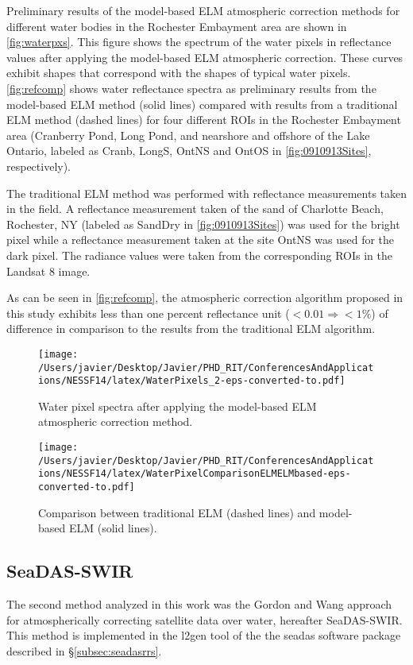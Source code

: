 Preliminary results of the model-based ELM atmospheric correction methods for different water bodies in the Rochester Embayment area are shown in \autoref{fig:waterpxs}. This figure shows the spectrum of the water pixels in reflectance values after applying the model-based ELM atmospheric correction. These curves exhibit shapes that correspond with the shapes of typical water pixels. \autoref{fig:refcomp} shows water reflectance spectra as preliminary results from the model-based ELM method (solid lines) compared with results from a traditional ELM method (dashed lines) for four different ROIs in the Rochester Embayment area (Cranberry Pond, Long Pond, and nearshore and offshore of the Lake Ontario, labeled as Cranb, LongS, OntNS and OntOS in \autoref{fig:0910913Sites}, respectively). 


The traditional ELM method was performed with reflectance measurements taken in the field. A reflectance measurement taken of the sand of Charlotte Beach, Rochester, NY (labeled as SandDry in \autoref{fig:0910913Sites}) was used for the bright pixel while a reflectance measurement taken at the site OntNS was used for the dark pixel. The radiance values were taken from the corresponding ROIs in the Landsat 8 image. 

As can be seen in \autoref{fig:refcomp}, the atmospheric correction algorithm proposed in this study exhibits less than one percent reflectance unit ($<0.01\Rightarrow <1\%$) of difference in comparison to the results from the traditional ELM algorithm.

\begin{figure}[htb]
    \centering
      \texttt{[image: /Users/javier/Desktop/Javier/PHD\_RIT/ConferencesAndApplications/NESSF14/latex/WaterPixels\_2-eps-converted-to.pdf]}
      \caption{Water pixel spectra after applying the model-based ELM atmospheric correction method.}
      \label{fig:waterpxs}
\end{figure}


\begin{figure}[htb]
    \centering
      \texttt{[image: /Users/javier/Desktop/Javier/PHD\_RIT/ConferencesAndApplications/NESSF14/latex/WaterPixelComparisonELMELMbased-eps-converted-to.pdf]}
      \caption{Comparison between traditional ELM (dashed lines) and model-based ELM (solid lines).}
      \label{fig:refcomp}
\end{figure}
\subsection{SeaDAS-SWIR}
\label{subsec:seadasswir}
The second method analyzed in this work was the Gordon and Wang \cite{Gordon:1994} approach for atmospherically correcting satellite data over water, hereafter SeaDAS-SWIR. This method is implemented in the l2gen tool of the the \gls{seadas} software package described in \S\ref{subsec:seadasrrs}.

